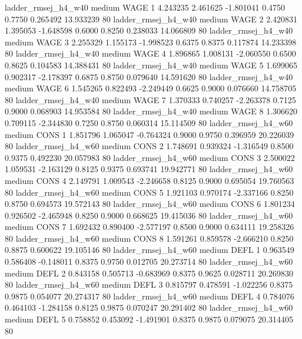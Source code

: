    ladder_rmsej_h4_w40     medium     WAGE                 1  4.243235 2.461625 -1.801041 0.4750 0.7750  0.265492   13.933239 80
   ladder_rmsej_h4_w40     medium     WAGE                 2  2.420831 1.395053 -1.648598 0.6000 0.8250  0.238033   14.066809 80
   ladder_rmsej_h4_w40     medium     WAGE                 3  2.255329 1.155173 -1.998523 0.6375 0.8375  0.117874   14.233398 80
   ladder_rmsej_h4_w40     medium     WAGE                 4  1.896865 1.008131 -2.060550 0.6500 0.8625  0.104583   14.388431 80
   ladder_rmsej_h4_w40     medium     WAGE                 5  1.699065 0.902317 -2.178397 0.6875 0.8750  0.079640   14.591620 80
   ladder_rmsej_h4_w40     medium     WAGE                 6  1.545265 0.822493 -2.249449 0.6625 0.9000  0.076660   14.758705 80
   ladder_rmsej_h4_w40     medium     WAGE                 7  1.370333 0.740257 -2.263378 0.7125 0.9000  0.068903   14.953584 80
   ladder_rmsej_h4_w40     medium     WAGE                 8  1.306620 0.709115 -2.344830 0.7250 0.8750  0.060314   15.114509 80
   ladder_rmsej_h4_w60     medium     CONS                 1  1.851796 1.065047 -0.764324 0.9000 0.9750  0.396959   20.226039 80
   ladder_rmsej_h4_w60     medium     CONS                 2  1.748691 0.939324 -1.316549 0.8500 0.9375  0.492230   20.057983 80
   ladder_rmsej_h4_w60     medium     CONS                 3  2.500022 1.059531 -2.163129 0.8125 0.9375  0.693741   19.942771 80
   ladder_rmsej_h4_w60     medium     CONS                 4  2.149791 1.009543 -2.246658 0.8125 0.9000  0.695054   19.760563 80
   ladder_rmsej_h4_w60     medium     CONS                 5  1.921103 0.970174 -2.337166 0.8250 0.8750  0.694573   19.572143 80
   ladder_rmsej_h4_w60     medium     CONS                 6  1.801234 0.926502 -2.465948 0.8250 0.9000  0.668625   19.415036 80
   ladder_rmsej_h4_w60     medium     CONS                 7  1.692432 0.890400 -2.577197 0.8500 0.9000  0.634111   19.258326 80
   ladder_rmsej_h4_w60     medium     CONS                 8  1.591261 0.859578 -2.666210 0.8250 0.8875  0.600622   19.105146 80
   ladder_rmsej_h4_w60     medium     DEFL                 1  0.963549 0.586408 -0.148011 0.8375 0.9750  0.012705   20.273714 80
   ladder_rmsej_h4_w60     medium     DEFL                 2  0.843158 0.505713 -0.683969 0.8375 0.9625  0.028711   20.269830 80
   ladder_rmsej_h4_w60     medium     DEFL                 3  0.815797 0.478591 -1.022256 0.8375 0.9875  0.054077   20.274317 80
   ladder_rmsej_h4_w60     medium     DEFL                 4  0.784076 0.464103 -1.284158 0.8125 0.9875  0.070247   20.291402 80
   ladder_rmsej_h4_w60     medium     DEFL                 5  0.758852 0.453092 -1.491901 0.8375 0.9875  0.079075   20.314405 80
